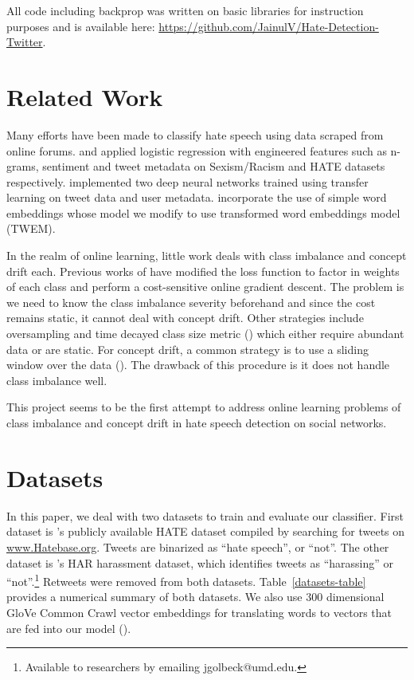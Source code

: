\documentclass{article}
\begin{document}
  All code including backprop was written on basic libraries for instruction purposes and is available here: \url{https://github.com/JainulV/Hate-Detection-Twitter}.

  \section{Related Work}
  Many efforts have been made to classify hate speech using data scraped from online forums. \cite{waseem-hovy:2016:N16-2} and \cite{hateoffensive}
  applied logistic regression with engineered features such as n-grams, sentiment and tweet metadata on Sexism/Racism and HATE datasets respectively. \cite{founta2018unified} implemented two
  deep neural networks trained using transfer learning on tweet data and user metadata. \cite{2017OnTU} incorporate the use of simple word embeddings whose model we modify
  to use transformed word embeddings model (TWEM).

  In the realm of online learning, little work deals with class imbalance and concept drift each. Previous works of \cite{DBLP:journals/corr/abs-1804-02246} have modified the loss function to factor in weights of each class
  and perform a cost-sensitive online gradient descent. The problem is we need to know the class imbalance severity beforehand and since the cost remains static, it cannot deal with concept drift.
  Other strategies include oversampling and time decayed class size metric (\cite{Wang2015ResamplingBasedEM}) which either require abundant data or are static. For concept drift, a common strategy 
  is to use a sliding window over the data (\cite{Hoens2011LearningFS}). The drawback of this procedure is it does not handle class imbalance well. 

  This project seems to be the first attempt to address online learning problems of class imbalance and concept drift in hate speech detection on social networks.

  \section{Datasets}
  In this paper, we deal with two datasets to train and evaluate our classifier. First dataset
  is \cite{hateoffensive}'s publicly available HATE dataset compiled by searching for tweets on \url{www.Hatebase.org}.
  Tweets are binarized as ``hate speech'', or ``not''.
  The other dataset is \cite{Golbeck:2017:LLC:3091478.3091509}'s HAR harassment dataset, which identifies
  tweets as ``harassing'' or ``not''.\footnote{Available to researchers
  by emailing jgolbeck@umd.edu.} Retweets were removed from both datasets. Table~\ref{datasets-table}
  provides a numerical summary of both datasets. We also use 300 dimensional GloVe Common Crawl vector embeddings for translating words to vectors that are fed into our model
  (\citet{pennington2014glove}).
\end{document}

